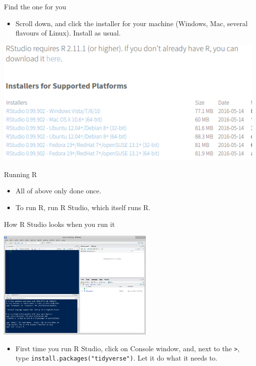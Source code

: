 \documentclass[
  ignorenonframetext,
]{beamer}
\providecommand{\tightlist}{%
  \setlength{\itemsep}{0pt}\setlength{\parskip}{0pt}}
\begin{document}
\begin{frame}{Find the one for you}
\protect\hypertarget{find-the-one-for-you}{}

\begin{itemize}
\tightlist
\item
  Scroll down, and click the installer for your machine (Windows, Mac,
  several flavours of Linux). Install as usual.
\end{itemize}

\includegraphics{rr40.png}

\end{frame}

\begin{frame}{Running R}
\protect\hypertarget{running-r-1}{}

\begin{itemize}
\tightlist
\item
  All of above only done once.
\item
  To run R, run R Studio, which itself runs R.
\end{itemize}

\end{frame}

\begin{frame}[fragile]{How R Studio looks when you run it}
\protect\hypertarget{how-r-studio-looks-when-you-run-it}{}

\includegraphics[width=\textwidth,height=2.08333in]{rstudio-startup.png}

\begin{itemize}
\tightlist
\item
  First time you run R Studio, click on Console window, and, next to the
  \texttt{\textgreater{}}, type \texttt{install.packages("tidyverse")}.
  Let it do what it needs to.
\end{itemize}

\end{frame}
\end{document}
